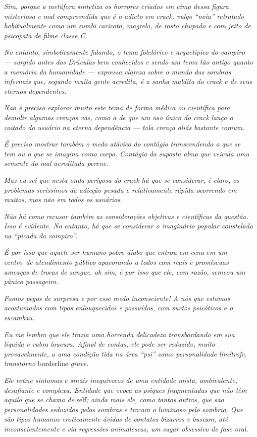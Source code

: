 \emph{Sim, porque a metáfora sintetiza os horrores criados em cima dessa
figura misteriosa e mal compreendida que é o adicto em crack, vulgo
``noia'' retratado habitualmente como um zumbi caricato, magrelo, de
rosto chupado e com jeito de psicopata de filme classe C.}

\emph{No entanto, simbolicamente falando, o tema folclórico e
arquetípico do vampiro --- surgido antes dos Dráculas bem conhecidos e
sendo um tema tão antigo quanto a memória da humanidade --- expressa
clareza sobre o mundo das sombras infernais que, segundo muita gente
acredita, é a sanha maldita do crack e de seus eternos dependentes.}

\emph{Não é preciso explorar muito este tema de forma médica ou
científica para demolir algumas crenças vãs, como a de que um uso único
do crack lança o coitado do usuário na eterna dependência --- tola crença
aliás bastante comum.}

\emph{É preciso mostrar também o medo atávico do contágio transcendendo
o que se tem ou o que se imagina como corpo. Contágio da suposta alma que veicula uma semente do mal acreditada perene.}

\emph{Mas eu sei que nesta onda perigosa do crack há que se considerar,
é claro, os problemas seríssimos da adicção pesada e relativamente
rápida ocorrendo em muitos, mas não em todos os usuários.}

\emph{Não há como recusar também as considerações objetivas e
científicas da questão. Isso é evidente. No entanto, há que se
considerar o imaginário popular constelado na ``picada do vampiro''.}

\emph{É por isso que aquele ser humano pobre diabo que entrou em cena em
um centro~de atendimento público apavorando a todos com reais e
promíscuas ameaças de trocas de sangue, ah sim, é por isso que ele, com
razão, semeou um pânico passageiro.}

\emph{Fomos pegos de surpresa e por esse medo inconsciente! A nós que
estamos acostumados com tipos enlouquecidos e possuídos, com surtos
psicóticos e o escambau.}

\emph{Eu me lembro que ele trazia uma horrenda delicadeza transbordando
em sua líquida e rubra loucura. Afinal de contas, ele pode ser reduzido,
muito provavelmente, a uma condição tida na área ``psi'' como personalidade
limítrofe, transtorno} borderline \emph{grave.}

\emph{Ele reúne sintomas e sinais inequívocos de uma entidade mista,
ambivalente, desafiante e complexa. Entidade que evoca as psiques
fragmentadas que não têm aquilo que se chama de} self\emph{; ainda mais ele,
como tantos outros, que são personalidades seduzidas pelas sombras e
trocam o luminoso pelo sombrio. Que são tipos humanos eroticamente
ávidos de contatos bizarros e buscam, até inconscientemente e via
regressões animalescas, um sugar obsessivo de fase oral.}

